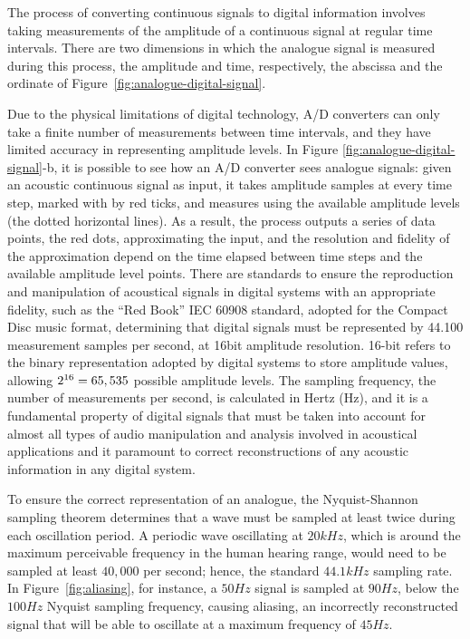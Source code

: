 The process of converting continuous signals to digital information involves taking measurements of the amplitude of a continuous signal at regular time intervals. There are two dimensions in which the analogue signal is measured during this process, the amplitude and time, respectively, the abscissa and the ordinate of Figure~\ref{fig:analogue-digital-signal}.\par
Due to the physical limitations of digital technology, A/D converters can only take a finite number of measurements between time intervals, and they have limited accuracy in representing amplitude levels. In Figure \ref{fig:analogue-digital-signal}-b, it is possible to see how an A/D converter sees analogue signals: given an acoustic continuous signal as input, it takes amplitude samples at every time step, marked with by red ticks, and measures using the available amplitude levels (the dotted horizontal lines). As a result, the process outputs a series of data points, the red dots, approximating the input, and the resolution and fidelity of the approximation depend on the time elapsed between time steps and the available amplitude level points. There are standards to ensure the reproduction and manipulation of acoustical signals in digital systems with an appropriate fidelity, such as the ``Red Book'' IEC 60908 standard, adopted for the Compact Disc music format, determining that digital signals must be represented by 44.100 measurement samples per second, at 16bit amplitude resolution. 16-bit refers to the binary representation adopted by digital systems to store amplitude values, allowing $2\textsuperscript{16}=65,535$ possible amplitude levels. The sampling frequency, the number of measurements per second, is calculated in Hertz (Hz), and it is a fundamental property of digital signals that must be taken into account for almost all types of audio manipulation and analysis involved in acoustical applications and it paramount to correct reconstructions of any acoustic information in any digital system. \par
To ensure the correct representation of an analogue, the Nyquist-Shannon sampling theorem determines that a wave must be sampled at least twice during each oscillation period. A periodic wave oscillating at $20kHz$, which is around the maximum perceivable frequency in the human hearing range, would need to be sampled at least $40,000$ per second; hence, the standard $44.1kHz$ sampling rate. In Figure~\ref{fig:aliasing}, for instance, a $50Hz$ signal is sampled at $90Hz$, below the $100Hz$ Nyquist sampling frequency, causing aliasing, an incorrectly reconstructed signal that will be able to oscillate at a maximum frequency of $45Hz$.

